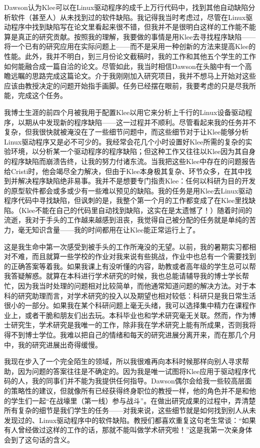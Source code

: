 \documentclass[letter,12pt]{book}
\begin{document}
\begin{CJK}{UTF8}{gbsn}
Dawson认为Klee可以在Linux驱动程序的成千上万行代码中，找到其他自动缺陷分析软件（甚至人）从未找到过的软件缺陷。我记得我当时考虑过，尽管在Linux驱动程序中找到缺陷写在论文里看起来很不错，但我并不是很明白这样的工作能不能算是真正的研究贡献。按照我的理解，我要做的事情是用Klee去寻找程序缺陷——将一个已有的研究应用在实际问题上——而不是采用一种创新的方法来提高Klee的性能。此外，我并不明白，到三月份论文截稿时，我的工作和其他五个学生的工作如何能融合成一篇自洽的论文。尽管如此，我当时相信Dawson在头脑中有一个高瞻远瞩的思路完成这篇论文。介于我刚刚加入研究项目，我并不想马上开始对这些应该由教授决定的问题开始指手画脚。任务已经摆在眼前，我要考虑的只是尽我所能，完成这个任务。

\breakline

我博士生涯的前四个月被我用于配置Klee以用它来分析上千行的Linux设备驱动程序，以期从中发现新的程序缺陷——这一过程并不顺利。尽管看起来我的任务并不复杂，但我很快就被淹没在了一些细节问题中，而这些细节对于让Klee能够分析Linux驱动程序又是必不可少的。我经常会花几个小时设置好Klee所需的复杂的实验环境，以分析某一个驱动程序的程序缺陷；但这种工作又往往以Klee因为其自身的程序缺陷而崩溃告终，让我的努力付诸东流。当我把这些Klee中存在的问题报告给Cristi时，他会竭尽全力解决，但由于Klee本身极其复杂、环节众多，在其中找到并解决程序缺陷绝非易事。我并不是想要专门指责Klee：任何以科研为目的开发的原型软件都会或多或少有一些难以预见的缺陷。我的任务是用Klee去Linux驱动程序代码中寻找缺陷，但讽刺的是，我整个第一个月的工作都变成了在Klee里找缺陷。（Klee不能在自己的代码里自动找到缺陷，这实在是太遗憾了！）随着时间的流逝，我对于手头的工作越来越感到沮丧，我觉得自己被分配的任务就是单纯的苦力，毫无知识含量——我的时间都用在让Klee能正常运行上了。

这是我生命中第一次感受到被手头的工作所淹没的无望。以前，我的暑期实习都相对不难，而且就算一些学校的作业对我来说有些挑战，作业中也总有一个需要找到的正确答案等着我。如果我课上有没听懂的内容，助教或者高年级的学生总可以帮我答疑解惑。就算在本科进行学术研究的时候，我也总能请辅导我的博士学长帮忙，因为我当时处理的问题相对比较简单，而他通常知道问题的解决方法。对于本科的研究助理而言，对学术研究的投入以及期望也相对较低：科研只是我日常生活很小的一部分。如果我在某个科研问题上毫无头绪，我可以选择集中精力在课程作业上，或者干脆和朋友们出去玩。本科毕业也和学术研究毫无关联。然而，作为博士研究生，学术研究是我唯一的工作，除非我在学术研究上能有所成果，否则我将得不到博士学位。我难以把自己的情绪和每天的研究进展分离开来，而在那几个月中，我的研究进展出奇得缓慢。

我现在步入了一个完全陌生的领域，所以我很难再向本科时候那样向别人寻求帮助，因为问题的答案往往是不确定的。因为我是唯一试图将Klee应用于驱动程序代码的人，我的同事们并不能为我提供任何指导。Dawson偶尔会给我一些较高层面的策略性的建议，但就像所有已经获得终身职位的教授一样，他的角色并不是和他的学生们一起“在战壕里（第一线）参与战斗”。在做出研究成果的过程中，弄清楚所有复杂的细节是我们学生的任务——对我来说，这些细节就是如何找到别人从未发现过的、Linux驱动程序中的软件缺陷。教授们都喜欢重复这句老生常谈：“如果有人曾经做过这样的工作的话，那就不能叫做学术研究啦！”这是我第一次亲身体会到了这句话的含义。


\end{CJK}
\end{document}
